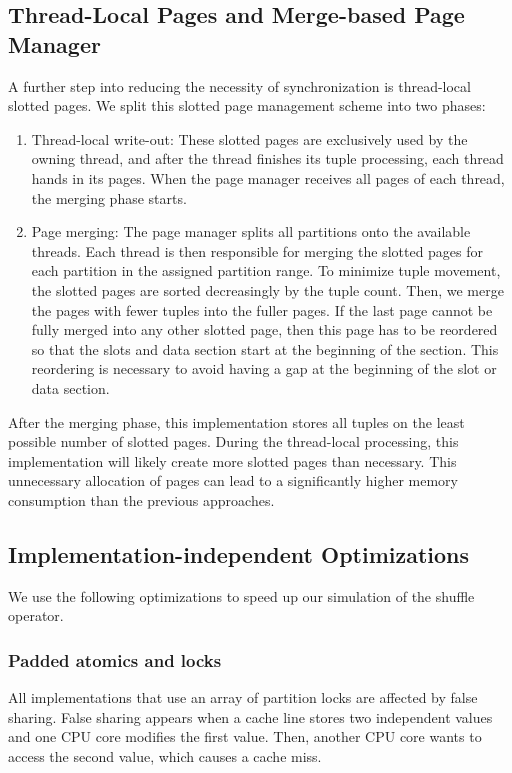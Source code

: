 \subsection{Thread-Local Pages and Merge-based Page Manager}\label{subsection-Thread-Local-Pages-Page-Manager}
A further step into reducing the necessity of synchronization is thread-local slotted pages.
We split this slotted page management scheme into two phases:
\begin{enumerate}
  \item Thread-local write-out: These slotted pages are exclusively used by the owning thread, and after the thread finishes its tuple processing, each thread hands in its pages.
        When the page manager receives all pages of each thread, the merging phase starts.

  \item Page merging: The page manager splits all partitions onto the available threads.
        Each thread is then responsible for merging the slotted pages for each partition in the assigned partition range.
        To minimize tuple movement, the slotted pages are sorted decreasingly by the tuple count.
        Then, we merge the pages with fewer tuples into the fuller pages.
        If the last page cannot be fully merged into any other slotted page, then this page has to be reordered so that the slots and data section start at the beginning of the section.
        This reordering is necessary to avoid having a gap at the beginning of the slot or data section.
\end{enumerate}
After the merging phase, this implementation stores all tuples on the least possible number of slotted pages.
During the thread-local processing, this implementation will likely create more slotted pages than necessary.
This unnecessary allocation of pages can lead to a significantly higher memory consumption than the previous approaches.
\subsection{Implementation-independent Optimizations}
We use the following optimizations to speed up our simulation of the shuffle operator.
\subsubsection{Padded atomics and locks}
All implementations that use an array of partition locks are affected by false sharing.
False sharing appears when a cache line stores two independent values and one \ac{CPU} core modifies the first value.
Then, another CPU core wants to access the second value, which causes a cache miss.

